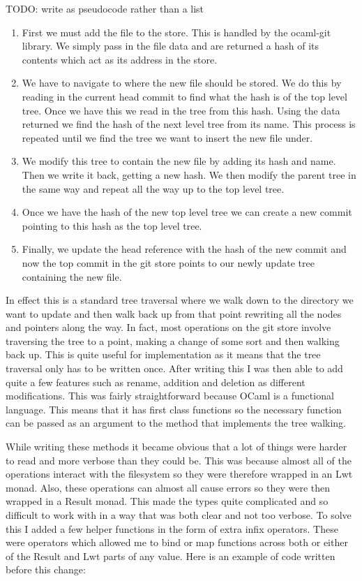 TODO: write as pseudocode rather than a list
\begin{enumerate}
\item
  First we must add the file to the store. This is handled by the ocaml-git library. We simply pass in the file data and are returned a hash of its contents which act as its address in the store.
\item
  We have to navigate to where the new file should be stored. We do this by reading in the current head commit to find what the hash is of the top level tree. Once we have this we read in the tree from this hash. Using the data returned we find the hash of the next level tree from its name. This process is repeated until we find the tree we want to insert the new file under.
\item
  We modify this tree to contain the new file by adding its hash and name. Then we write it back, getting a new hash. We then modify the parent tree in the same way and repeat all the way up to the top level tree.
\item
  Once we have the hash of the new top level tree we can create a new commit pointing to this hash as the top level tree.
\item
  Finally, we update the head reference with the hash of the new commit and now the top commit in the git store points to our newly update tree containing the new file.
\end{enumerate}

In effect this is a standard tree traversal where we walk down to the directory we want to update and then walk back up from that point rewriting all the nodes and pointers along the way. In fact, most operations on the git store involve traversing the tree to a point, making a change of some sort and then walking back up. This is quite useful for implementation as it means that the tree traversal only has to be written once. After writing this I was then able to add quite a few features such as rename, addition and deletion as different modifications. This was fairly straightforward because OCaml is a functional language. This means that it has first class functions so the necessary function can be passed as an argument to the method that implements the tree walking.

While writing these methods it became obvious that a lot of things were harder to read and more verbose than they could be. This was because almost all of the operations interact with the filesystem so they were therefore wrapped in an Lwt monad. Also, these operations can almost all cause errors so they were then wrapped in a Result monad. This made the types quite complicated and so difficult to work with in a way that was both clear and not too verbose. To solve this I added a few helper functions in the form of extra infix operators. These were operators which allowed me to bind or map functions across both or either of the Result and Lwt parts of any value. Here is an example of code written before this change:

